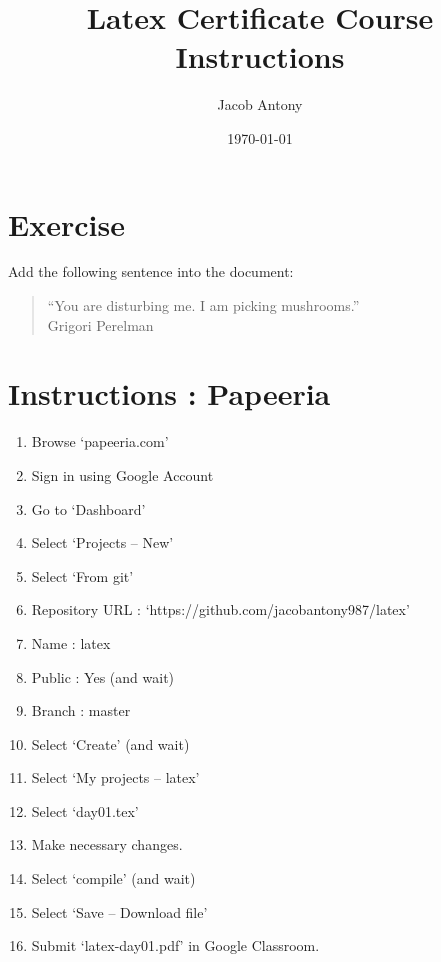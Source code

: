 \documentclass{article}
\title{Latex Certificate Course Instructions}
\author{Jacob Antony}
\date{\today}
\begin{document}
\maketitle

\section{Exercise}
	Add the following sentence into the document: 
	\begin{quote}
		``You are disturbing me. I am picking mushrooms.''\\
		 Grigori Perelman
	\end{quote}

\section{Instructions : Papeeria}
	\begin{enumerate}
		\item Browse `papeeria.com'
		\item Sign in using Google Account
		\item Go to `Dashboard'
		\item Select `Projects -- New'
		\item Select `From git'
		\item Repository URL : `https://github.com/jacobantony987/latex'
		\item Name : latex
		\item Public : Yes (and wait)
		\item Branch : master
		\item Select `Create' (and wait)
		\item Select `My projects -- latex'
		\item Select `day01.tex'
		\item Make necessary changes.
		\item Select `compile' (and wait)
		\item Select `Save -- Download file'
		\item Submit `latex-day01.pdf' in Google Classroom.
	\end{enumerate}
\end{document}
